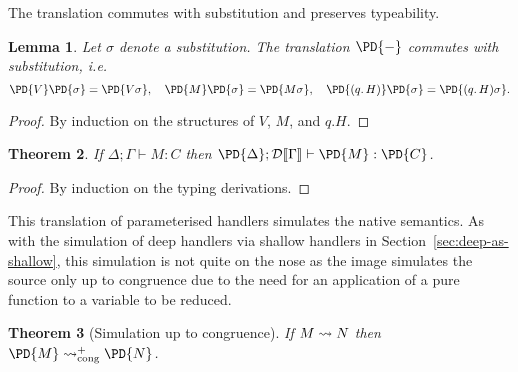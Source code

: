 \documentclass[12pt,phd,lfcs,twoside,openright,logo,leftchapter,normalheadings]{infthesis}
\theoremstyle{plain}
\newtheorem{theorem}{Theorem}[chapter]
\newtheorem{lemma}[theorem]{Lemma}
\theoremstyle{definition}
\begin{document}
The translation commutes with substitution and preserves typeability.
%
\begin{lemma}\label{lem:pd-subst}
  Let $\sigma$ denote a substitution. The translation $\PD{-}$
  commutes with substitution, i.e.
  \[
    \PD{V}\PD{\sigma} = \PD{V\sigma},\quad
    \PD{M}\PD{\sigma} = \PD{M\sigma},\quad
    \PD{(q.\,H)}\PD{\sigma} = \PD{(q.\,H)\sigma}.
  \]
\end{lemma}
%
\begin{proof}
  By induction on the structures of $V$, $M$, and $q.H$.
\end{proof}
%
\begin{theorem}
If $\Delta; \Gamma \vdash M : C$ then $\PD{\Delta};
\sdtrans{\Gamma} \vdash \PD{M} : \PD{C}$.
\end{theorem}
%
\begin{proof}
  By induction on the typing derivations.
\end{proof}
%
This translation of parameterised handlers simulates the native
semantics. As with the simulation of deep handlers via shallow
handlers in Section~\ref{sec:deep-as-shallow}, this simulation is not
quite on the nose as the image simulates the source only up to
congruence due to the need for an application of a pure function to a
variable to be reduced.
%
\begin{theorem}[Simulation up to congruence]
  \label{thm:param-simulation}
  If $M \leadsto N$ then $\PD{M} \reducesto^+_{\Cong} \PD{N}$.
\end{theorem}
%
\end{document}
